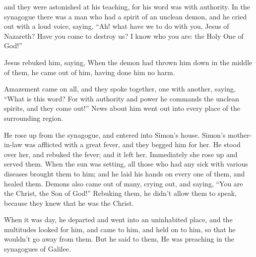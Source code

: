 {and they were astonished at his teaching, for his word was with authority.
In the synagogue there was a man who had a spirit of an unclean demon, and he cried out with a loud voice,
saying, “Ah! what have we to do with you, Jesus of Nazareth? Have you come to destroy us? I know who you are: the Holy One of God!”
\par }{\PP {}Jesus rebuked him, saying,
{} When the demon had thrown him down in the middle of them, he came out of him, having done him no harm.
\par }{\PP {}Amazement came on all, and they spoke together, one with another, saying, “What is this word? For with authority and power he commands the unclean spirits, and they come out!”
News about him went out into every place of the surrounding region.
\par }{\PP {}He rose up from the synagogue, and entered into Simon’s house. Simon’s mother-in-law was afflicted with a great fever, and they begged him for her.
He stood over her, and rebuked the fever; and it left her. Immediately she rose up and served them.
When the sun was setting, all those who had any sick with various diseases brought them to him; and he laid his hands on every one of them, and healed them.
Demons also came out of many, crying out, and saying, “You are the Christ, the Son of God!” Rebuking them, he didn’t allow them to speak, because they knew that he was the Christ.
\par }{\PP {}When it was day, he departed and went into an uninhabited place, and the multitudes looked for him, and came to him, and held on to him, so that he wouldn’t go away from them.
But he said to them,
{}
He was preaching in the synagogues of Galilee.

}
